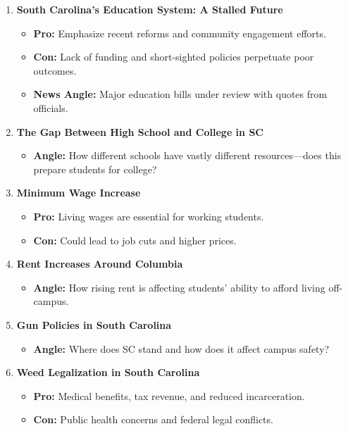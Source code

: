 \documentclass{article}
\begin{document}
\begin{enumerate}[leftmargin=*]
    \item \textbf{South Carolina's Education System: A Stalled Future}
    \begin{itemize}
        \item \textbf{Pro:} Emphasize recent reforms and community engagement efforts.
        \item \textbf{Con:} Lack of funding and short-sighted policies perpetuate poor outcomes.
        \item \textbf{News Angle:} Major education bills under review with quotes from officials.
    \end{itemize}

    \item \textbf{The Gap Between High School and College in SC}
    \begin{itemize}
        \item \textbf{Angle:} How different schools have vastly different resources---does this prepare students for college?
    \end{itemize}

    \item \textbf{Minimum Wage Increase}
    \begin{itemize}
        \item \textbf{Pro:} Living wages are essential for working students.
        \item \textbf{Con:} Could lead to job cuts and higher prices.
    \end{itemize}

    \item \textbf{Rent Increases Around Columbia}
    \begin{itemize}
        \item \textbf{Angle:} How rising rent is affecting students' ability to afford living off-campus.
    \end{itemize}

    \item \textbf{Gun Policies in South Carolina}
    \begin{itemize}
        \item \textbf{Angle:} Where does SC stand and how does it affect campus safety?
    \end{itemize}

    \item \textbf{Weed Legalization in South Carolina}
    \begin{itemize}
        \item \textbf{Pro:} Medical benefits, tax revenue, and reduced incarceration.
        \item \textbf{Con:} Public health concerns and federal legal conflicts.
    \end{itemize}
\end{enumerate}
\end{document}
